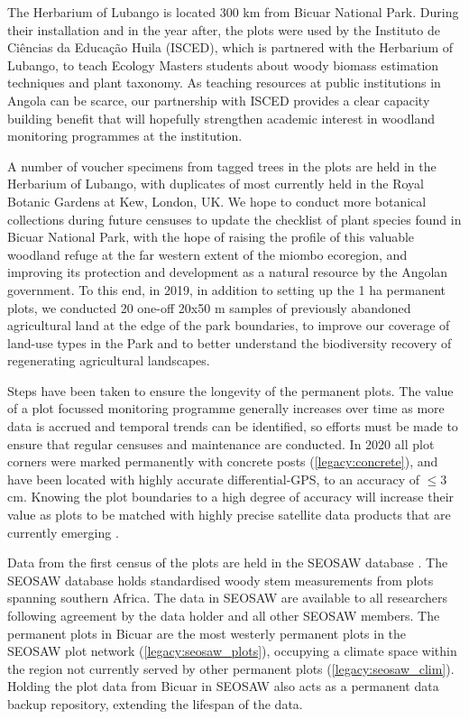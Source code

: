 \begin{refsection}
The Herbarium of Lubango is located \textapprox{}300 km from Bicuar National Park. During their installation and in the year after, the plots were used by the Instituto de Ci\^{e}ncias da Educa\c{c}\~{a}o Huila (ISCED), which is partnered with the Herbarium of Lubango, to teach Ecology Masters students about woody biomass estimation techniques and plant taxonomy. As teaching resources at public institutions in Angola can be scarce, our partnership with ISCED provides a clear capacity building benefit that will hopefully strengthen academic interest in woodland monitoring programmes at the institution.

A number of voucher specimens from tagged trees in the plots are held in the Herbarium of Lubango, with duplicates of most currently held in the Royal Botanic Gardens at Kew, London, UK. We hope to conduct more botanical collections during future censuses to update the checklist of plant species found in Bicuar National Park, with the hope of raising the profile of this valuable woodland refuge at the far western extent of the miombo ecoregion, and improving its protection and development as a natural resource by the Angolan government. To this end, in 2019, in addition to setting up the 1 ha permanent plots, we conducted 20 one-off 20x50 m samples of previously abandoned agricultural land at the edge of the park boundaries, to improve our coverage of land-use types in the Park and to better understand the biodiversity recovery of regenerating agricultural landscapes.

Steps have been taken to ensure the longevity of the permanent plots. The value of a plot focussed monitoring programme generally increases over time as more data is accrued and temporal trends can be identified, so efforts must be made to ensure that regular censuses and maintenance are conducted. In 2020 all plot corners were marked permanently with concrete posts (\autoref{legacy:concrete}), and have been located with highly accurate differential-GPS, to an accuracy of $\le$3 cm. Knowing the plot boundaries to a high degree of accuracy will increase their value as plots to be matched with highly precise satellite data products that are currently emerging \citep{Exbrayat2019, GeorgeChacon2019, Wagner2018}. 

Data from the first census of the plots are held in the SEOSAW database \citep{SEOSAW2020}. The SEOSAW database holds standardised woody stem measurements from plots spanning southern Africa. The data in SEOSAW are available to all researchers following agreement by the data holder and all other SEOSAW members. The permanent plots in Bicuar are the most westerly permanent plots in the SEOSAW plot network (\autoref{legacy:seosaw_plots}), occupying a climate space within the region not currently served by other permanent plots (\autoref{legacy:seosaw_clim}). Holding the plot data from Bicuar in SEOSAW also acts as a permanent data backup repository, extending the lifespan of the data.


\end{refsection}
